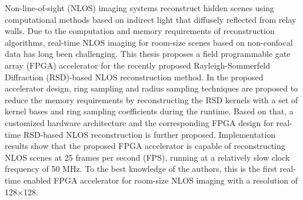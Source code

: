 \documentclass[master]{shtthesis}             %
\begin{document}
\maketitle

\frontmatter
\begin{abstract}[flattitle]
  非视域（Non-line-of-sight，NLOS）成像是利用从中继面漫射反射的间接光来进行计算，从而重构隐藏场景的成像方式。由于重构算法对计算和存储需求都非常高，因此基于非共焦数据的室内场景的实时NLOS成像一直是一个挑战。针对最近提出的基于瑞利-索末菲衍射（Rayleigh-Sommerfeld Diffraction，RSD）的NLOS重构方法，本文设计了一种现场可编程门阵列（field programmable gate array，FPGA）加速器。在所设计的加速器中，本文提出了环形脉冲采样和径向采样技术。通过这两项技术，加速器在运行时可以使用一组环形基函数和线性组合系数来重构RSD卷积核来减少存储需求。在此基础上，本文进一步提出了一种基于RSD的NLOS实时重构的定制硬件架构和相应的FPGA设计。实现结果表明，该FPGA加速器能够以每秒25帧的速度重构NLOS场景，并以相对较慢的时钟频率（50MHz）运行。据作者所知，这是第一个用于室内NLOS成像的实时FPGA加速器，分辨率为128$\times$128。
\end{abstract}

\begin{abstract*}[flattitle]
  Non-line-of-sight (NLOS) imaging systems reconstruct hidden scenes using computational methods based on indirect light that diffusely reflected from relay walls. Due to the computation and memory requirements of reconstruction algorithms, real-time NLOS imaging for room-size scenes based on non-confocal data has long been challenging. This thesis proposes a field programmable gate array (FPGA) accelerator for the recently proposed Rayleigh-Sommerfeld Diffraction (RSD)-based NLOS reconstruction method. In the proposed accelerator design, ring sampling and radius sampling techniques are proposed to reduce the memory requirements by reconstructing the RSD kernels with a set of kernel bases and ring sampling coefficients during the runtime. Based on that, a customized hardware architecture and the corresponding FPGA design for real-time RSD-based NLOS reconstruction is further proposed. Implementation results show that the proposed FPGA accelerator is capable of reconstructing NLOS scenes at 25 frames per second (FPS), running at a relatively slow clock frequency of 50 MHz. To the best knowledge of the authors, this is the first real-time enabled FPGA accelerator for room-size NLOS imaging with a resolution of 128$\times$128.
\end{abstract*}

\makeindices
\end{document}
